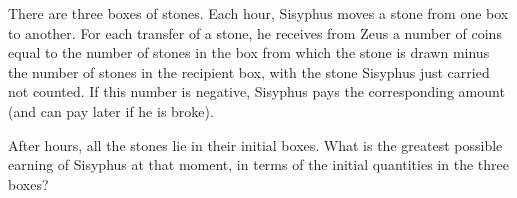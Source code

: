 \begin{problem}
  There are three boxes of stones. Each hour, Sisyphus moves a stone from one box to another. For each transfer of a stone, he receives from Zeus a number of coins equal to the number of stones in the box from which the stone is drawn minus the number of stones in the recipient box, with the stone Sisyphus just carried not counted. If this number is negative, Sisyphus pays the corresponding amount (and can pay later if he is broke).

After 
 hours, all the stones lie in their initial boxes. What is the greatest possible earning of Sisyphus at that moment, in terms of the initial quantities in the three boxes?

    \label{95RUS}
\end{problem}